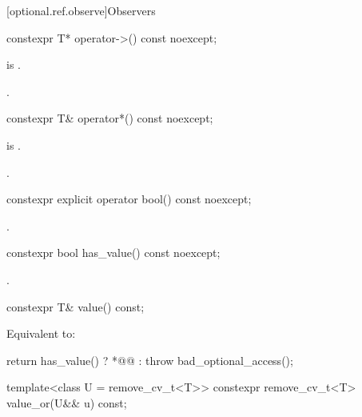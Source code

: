 [optional.ref.observe]{Observers}

\begin{itemdecl}
constexpr T* operator->() const noexcept;
\end{itemdecl}

\begin{itemdescr}
\pnum
\hardexpects
{} is .

\pnum
\returns
{}.

\end{itemdescr}

\begin{itemdecl}
constexpr T& operator*() const noexcept;
\end{itemdecl}

\begin{itemdescr}
\pnum
\hardexpects
{} is .

\pnum
\returns
{}.
\end{itemdescr}

\begin{itemdecl}
constexpr explicit operator bool() const noexcept;
\end{itemdecl}

\begin{itemdescr}
\pnum
\returns
{}.
\end{itemdescr}

\begin{itemdecl}
constexpr bool has_value() const noexcept;
\end{itemdecl}

\begin{itemdescr}
\pnum
\returns
{}.
\end{itemdescr}

\begin{itemdecl}
constexpr T& value() const;
\end{itemdecl}

\begin{itemdescr}
\pnum
\effects
Equivalent to:
\begin{codeblock}
return has_value() ? *@@ : throw bad_optional_access();
\end{codeblock}
\end{itemdescr}

\begin{itemdecl}
template<class U = remove_cv_t<T>> constexpr remove_cv_t<T> value_or(U&& u) const;
\end{itemdecl}

